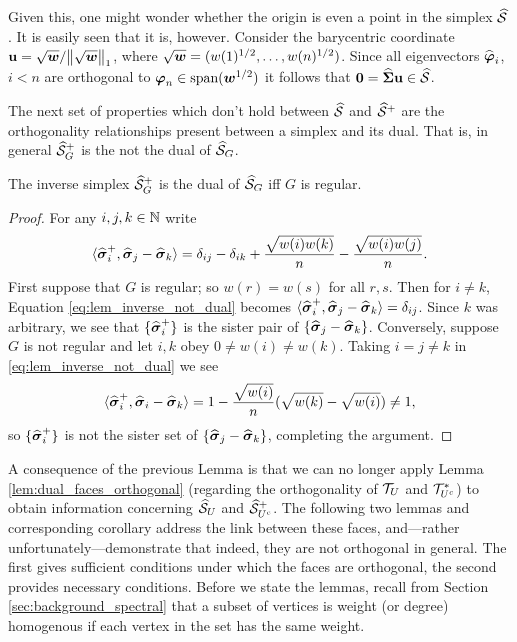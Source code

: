 Given this, one might wonder whether the origin is even a point in the simplex $\widehat{\mathcal{S}}$. It is easily seen that it is, however. Consider the barycentric coordinate $\vb{u} = \sqrt{\vb*{w}}/\norm{\sqrt{\vb*{w}}}_1$, where $\sqrt{\vb*{w}}=(w(1)^{1/2}, \dots, w(n)^{1/2})$. Since all eigenvectors $\widehat{\vb*{\varphi}}_i$, $i<n$ are orthogonal to $\vb*{\varphi}_n \in\textnormal{span}(\vb*{w}^{1/2})$ it follows that $\vb{0} = \widehat{\boldsymbol{\Sigma}}\vb{u}\in\widehat{\mathcal{S}}$. 

The next set of properties which don't hold between $\widehat{\mathcal{S}}$ and $\widehat{\mathcal{S}}^+$ are the orthogonality relationships present between a simplex and its dual. That is, in general $\widehat{\mathcal{S}}^+_G$ is the not the dual of $\widehat{\mathcal{S}}_G$. 

\begin{lemma}
	\label{lem:inverse_not_dual}
	The inverse simplex $\widehat{\mathcal{S}}_G^+$ is the dual of $\widehat{\mathcal{S}}_G$ iff $G$ is regular. 
\end{lemma}
\begin{proof}
	For any $i,j,k\in\mathbb{N}$ write 
	\begin{equation}
	\label{eq:lem_inverse_not_dual}
	\langle \widehat{\vb*{\sigma}}_i^+,\widehat{\vb*{\sigma}}_j-\widehat{\vb*{\sigma}}_k\rangle = \delta_{ij} - \delta_{ik} + \frac{\sqrt{w(i)w(k)}}{n} - \frac{\sqrt{w(i)w(j)}}{n}.
	\end{equation}
	First suppose that $G$ is regular; so  $w(r)=w(s)$ for all $r,s$. Then for $i\neq k$, Equation \eqref{eq:lem_inverse_not_dual} becomes $\langle \widehat{\vb*{\sigma}}_i^+,\widehat{\vb*{\sigma}}_j-\widehat{\vb*{\sigma}}_k\rangle = \delta_{ij}$. Since $k$ was arbitrary, we see that $\{\widehat{\vb*{\sigma}}_i^+\}$ is the sister pair of $\{\widehat{\vb*{\sigma}}_j-\widehat{\vb*{\sigma}}_k\}$. Conversely, suppose $G$ is not regular and let $i,k$ obey $0\neq w(i)\neq w(k)$. Taking $i=j\neq k$ in \eqref{eq:lem_inverse_not_dual} we see 
	\[\langle \widehat{\vb*{\sigma}}_i^+,\widehat{\vb*{\sigma}}_i-\widehat{\vb*{\sigma}}_k\rangle = 1 - \frac{\sqrt{w(i)}}{n}(\sqrt{w(k)}-\sqrt{w(i)})\neq 1,\]
	so $\{\widehat{\vb*{\sigma}}_i^+\}$ is not the sister set of $\{\widehat{\vb*{\sigma}}_j-\widehat{\vb*{\sigma}}_k\}$, completing the argument. 
\end{proof}

A consequence of the previous Lemma is that we can no longer apply Lemma \ref{lem:dual_faces_orthogonal} (regarding the orthogonality of $\mathcal{T}_U$ and $\mathcal{T}_{U^c}^*$) to obtain information concerning $\widehat{\mathcal{S}}_U$ and $\widehat{\mathcal{S}}_{U^c}^+$. The following two lemmas and corresponding corollary address the link between these faces, and---rather unfortunately---demonstrate that indeed, they are not orthogonal in general. 
The first gives sufficient conditions under which the faces are orthogonal, the second provides necessary conditions. 
Before we state the lemmas, recall from Section \ref{sec:background_spectral} that a subset of vertices is weight  (or degree) homogenous if each vertex in the set has the same weight. 

